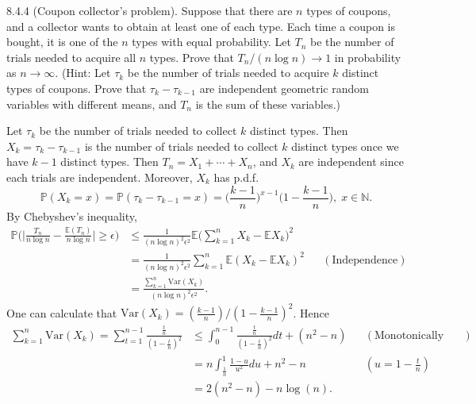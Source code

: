 \begin{exercise} 8.4.4 (Coupon collector’s problem). Suppose that there are $n$ types of coupons, and a collector wants to obtain at least one of each type. Each time a coupon is bought, it is one of the $n$ types with equal probability. Let $T_n$ be the number of trials needed to acquire all $n$ types. Prove that $T_n/(n \log n)\rightarrow 1$ in probability as $n\rightarrow\infty$. (Hint: Let $\tau_k$ be the number of trials needed to acquire $k$ distinct types of coupons. Prove that $\tau_k-\tau_{k-1}$ are independent geometric random variables with different means, and $T_n$ is the sum of these variables.)
\end{exercise}
\begin{answer} Let $\tau_k$ be the number of trials needed to collect $k$ distinct types. Then $X_k=\tau_k-\tau_{k-1}$ is the number of trials needed to collect $k$ distinct types once we have $k-1$ distinct types. Then $T_n=X_1+\cdots+X_n$, and $X_k$ are independent since each trials are independent. Moreover, $X_k$ has p.d.f.
\begin{equation*}
    \mathbb{P}(X_k=x)=\mathbb{P}(\tau_k-\tau_{k-1}=x)=\Big(\frac{k-1}{n}\Big)^{x-1}\Big(1-\frac{k-1}{n}\Big),\;x\in\mathbb{N}.
\end{equation*}
By Chebyshev's inequality,
\begin{equation*}
\begin{aligned}
    \mathbb{P}\Big(\Big|\frac{T_n}{n\log n}-\frac{\mathbb{E}(T_n)}{n\log n}\Big|\geq\epsilon\Big)&\leq \frac{1}{(n\log n)^2\epsilon^2}\mathbb{E}\Big(\sum_{k=1}^nX_k-\mathbb{E}X_k\Big)^2\\
    &=\frac{1}{(n\log n)^2\epsilon^2}\sum_{k=1}^n\mathbb{E}(X_k-\mathbb{E}X_k)^2 && (\text{Independence}) \\
    &=\frac{\sum_{k=1}^n\text{Var}(X_k)}{(n\log n)^2\epsilon^2}.
\end{aligned}
\end{equation*}
One can calculate that $\text{Var}(X_k)=(\frac{k-1}{n})/(1-\frac{k-1}{n})^2$. Hence
\begin{equation*}
\begin{aligned}
    \sum_{k=1}^n\text{Var}(X_k)=\sum_{t=1}^{n-1}\frac{\frac{t}{n}}{(1-\frac{t}{n})^2}&\leq\int_0^{n-1}\frac{\frac{t}{n}}{(1-\frac{t}{n})^2}dt+(n^2-n) && (\text{Monotonically increase})\\&
    =n\int_{\frac{1}{n}}^1\frac{1-u}{u^2}du+n^2-n && (u=1-\frac{t}{n})\\&
    =2(n^2-n)-n\log(n).
\end{aligned}

\end{equation*}
\end{answer}
